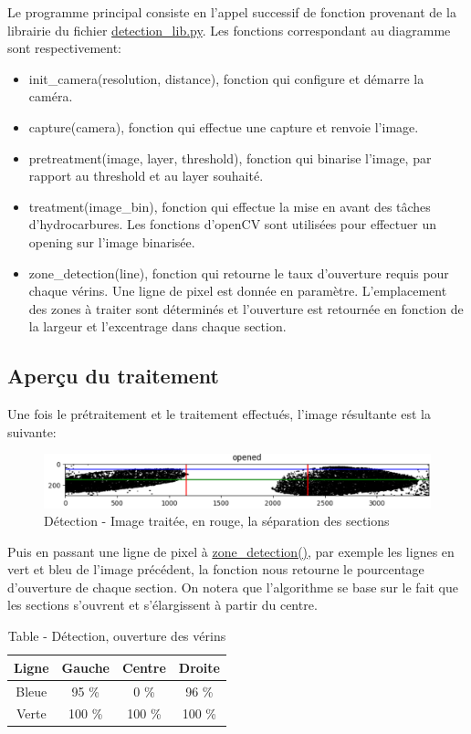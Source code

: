 Le programme principal consiste en l'appel successif de fonction provenant de la librairie du fichier \underline{detection\_lib.py}.
Les fonctions correspondant au diagramme sont respectivement:
\begin{itemize}
    \item init\_camera(resolution, distance), fonction qui configure et démarre la caméra.
    \item capture(camera), fonction qui effectue une capture et renvoie l'image.
    \item pretreatment(image, layer, threshold), fonction qui binarise l'image, par rapport au threshold et au layer souhaité.
    \item treatment(image\_bin), fonction qui effectue la mise en avant des tâches d'hydrocarbures. Les fonctions d'openCV sont utilisées pour effectuer un opening sur l'image binarisée.
    \item zone\_detection(line), fonction qui retourne le taux d'ouverture requis pour chaque vérins. Une ligne de pixel est donnée en paramètre. L'emplacement des zones à traiter sont déterminés et l'ouverture est retournée en fonction de la largeur et l'excentrage dans chaque section.
\end{itemize}

\subsection{Aperçu du traitement}
Une fois le prétraitement et le traitement effectués, l'image résultante est la suivante:

\begin{figure}[H]
    \centering
    \includegraphics[width=13cm]{assets/figures/traitement1.PNG}
    \caption{Détection - Image traitée, en rouge, la séparation des sections}
\end{figure}

Puis en passant une ligne de pixel à \underline{zone\_detection()}, par exemple les lignes en vert et bleu de l'image précédent, la fonction
nous retourne le pourcentage d'ouverture de chaque section. On notera que l'algorithme se base sur le fait que les sections s'ouvrent
et s'élargissent à partir du centre.

\begin{table}[H]
    \begin{center}
        \caption{Table - Détection, ouverture des vérins}
        \begin{tabular}{|c|c|c|c|}
            Ligne & Gauche & Centre & Droite \\ \hline
            Bleue & 95 \%  & 0 \%   & 96 \%  \\
            Verte & 100 \% & 100 \% & 100 \% \\
        \end{tabular}
    \end{center}
\end{table}